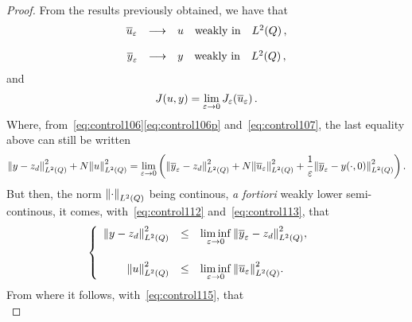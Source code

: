 \begin{proof}%
    From the results previously obtained, we have that
    \begin{equation}\label{eq:control112}
        \begin{array}{rclll}
            {\overline{u}}_{\varepsilon} & \longrightarrow & u & \text{weakly in} & L^{2}\!\left({Q}\right),
        \end{array}
    \end{equation}

    \begin{equation}\label{eq:control113}
        \begin{array}{rcllll}
            {\overline{y}}_{\varepsilon} & \longrightarrow & y & \text{weakly in} & L^{2}\!\left({Q}\right),
        \end{array}
    \end{equation}
    and
    \begin{equation*}
        J(u,y) = \lim_{\varepsilon\to 0}J_{\varepsilon}\!\left({{\overline{u}}_{\varepsilon}}\right).
    \end{equation*}
    Where, from~\eqref{eq:control106}\eqref{eq:control106p}
    and~\eqref{eq:control107}, the last equality above can still be written
    \begin{equation}\label{eq:control115}
        \normecq{y - z_{d}} + N\normecq{u} = \lim_{\veps\to 0}\left({%
            \normecq{\bareps{y} - z_{d}} + N\normecq{\bareps{u}} +
            \dfrac{1}{\veps}\normecq{\bareps{y} - \condinitiale{y}}
        }\right).
    \end{equation}
    But then, the norm ${\left\|{\cdot }\right\|}_{L^{2}\left({Q}\right)}$ being continous, \textit{a
    fortiori} weakly lower semi-continous, it comes,
    with~\eqref{eq:control112} and~\eqref{eq:control113}, that
    \begin{equation*}
        \begin{cases}\displaystyle
            \begin{array}{rcll}
                {\left\|{y - z_{d} }\right\|}_{L^{2}\left({Q}\right)}^{2} & \leq & \underset{\varepsilon\to
                0}{\lim\inf}\, {\left\|{{\overline{y}}_{\varepsilon} - z_{d} }\right\|}_{L^{2}\left({Q}\right)}^{2},\\
                \\
                {\left\|{u }\right\|}_{L^{2}\left({Q}\right)}^{2} & \leq & \underset{\varepsilon\to 0}{\lim\inf}\,
                {\left\|{{\overline{u}}_{\varepsilon} }\right\|}_{L^{2}\left({Q}\right)}^{2}.
            \end{array}
        \end{cases}
    \end{equation*}
    From where it follows, with~\eqref{eq:control115}, that
    \begin{equation}\label{eq:control118}

\end{equation}
\end{proof}
